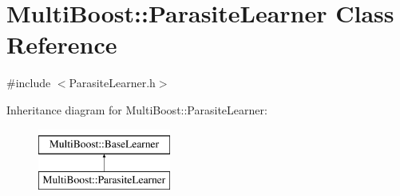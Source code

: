 \hypertarget{classMultiBoost_1_1ParasiteLearner}{
\section{MultiBoost::ParasiteLearner Class Reference}
\label{classMultiBoost_1_1ParasiteLearner}
}


{\ttfamily \#include $<$ParasiteLearner.h$>$}

Inheritance diagram for MultiBoost::ParasiteLearner:\begin{figure}[H]
\begin{center}
\leavevmode
\includegraphics[height=2.000000cm]{classMultiBoost_1_1ParasiteLearner}
\end{center}
\end{figure}
